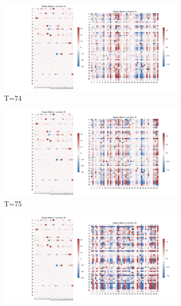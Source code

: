 \documentclass{article}
\begin{document}
\begin{figure}[h!]
  \centering
  \begin{minipage}[b]{0.45\linewidth}
    \centering
    \begin{subfigure}[b]{\linewidth}
      \includegraphics[width=\textwidth]{Plastic_combined_74}
      \caption{T=74}
    \end{subfigure}
    \vfill
    \begin{subfigure}[b]{\linewidth}
      \includegraphics[width=\textwidth]{Plastic_combined_75}
      \caption{T=75}
    \end{subfigure}
  \end{minipage}
  \hfill
  \begin{minipage}[b]{0.45\linewidth}
    \centering
    \begin{subfigure}[b]{\linewidth}
      \includegraphics[width=\textwidth]{Plastic_combined_76}

\end{subfigure}
\end{minipage}
\end{figure}
\end{document}
